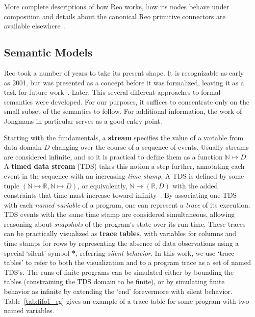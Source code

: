 More complete descriptions of how Reo works, how its nodes behave under composition and details about the canonical Reo primitive connectors are available elsewhere~\cite{arbab2004modeling, arbab2005abstract, arbab2011puff}.


\subsection{Semantic Models}
\label{sec:semantic_models}
Reo took a number of years to take its present shape. It is recognizable as early as 2001, but was presented as a concept before it was formalized, leaving it as a task for future work~\cite{jongmans2012overview}. Later, This several different approaches to formal semantics were developed. For our purposes, it suffices to concentrate only on the small subset of the semantics to follow. For additional information, the work of Jongmans in particular serves as a good entry point\cite{jongmans2012overview}.


Starting with the fundamentals, a \textbf{stream} specifies the value of a variable from data domain $D$ changing over the course of a sequence of events. Usually streams are considered infinite, and so it is practical to define them as a function $\mathbb{N}\mapsto{}D$. A \textbf{timed data stream} (TDS) takes this notion a step further, annotating each event in the sequence with an increasing \textit{time stamp}. A TDS is defined by some tuple $(\mathbb{N}\mapsto{}\mathbb{R}, \mathbb{N}\mapsto{}D)$, or equivalently, $\mathbb{N}\mapsto{}(\mathbb{R}, D)$ with the added constraints that time must increase toward infinity~\cite{arbab2004modeling}. By associating one TDS with each \textit{named variable} of a program, one can represent a \textit{trace} of its execution. TDS events with the same time stamp are considered simultaneous, allowing reasoning about \textit{snapshots} of the program's state over its run time. These traces can be practically visualized as \textbf{trace tables}, with variables for columns and time stamps for rows by representing the absence of data observations using a special `silent' symbol \textbf{*}, referring \textit{silent behavior}. In this work, we use `trace tables' to refer to both the visualization and to a program trace as a set of named TDS's. The runs of finite programs can be simulated either by bounding the tables (constraining the TDS domain to be finite), or by simulating finite behavior as infinite by extending the `end' forevermore with silent behavior. Table~\ref{tab:fifo1_eg} gives an example of a trace table for some program with two named variables.


